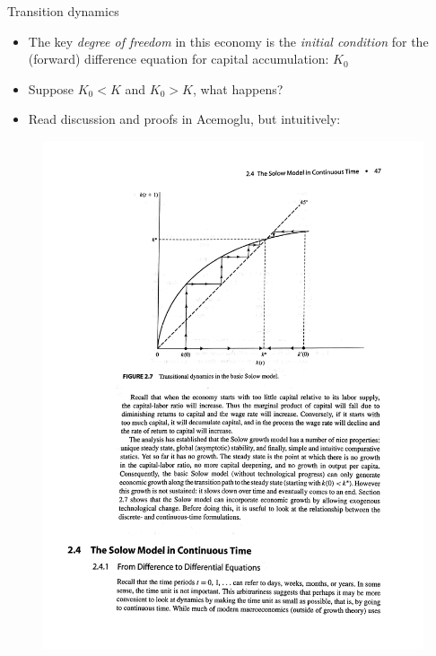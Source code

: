 \documentclass[10pt]{beamer}
\begin{document}
\begin{frame}{Transition dynamics}

\vspace{5mm}
\begin{itemize}
\item The key \textit{degree of freedom} in this economy is the \textit{initial condition} for the (forward) difference equation for capital accumulation: $K_0$

\item Suppose $K_0 < K$ and $K_0 > K$, what happens?

\item Read discussion and proofs in Acemoglu, but intuitively:
\end{itemize}

\begin{figure}
	\centering
	\includegraphics[scale=0.5]{./solow_transition_acemoglu.pdf}
\end{figure}
\end{frame}
\end{document}
